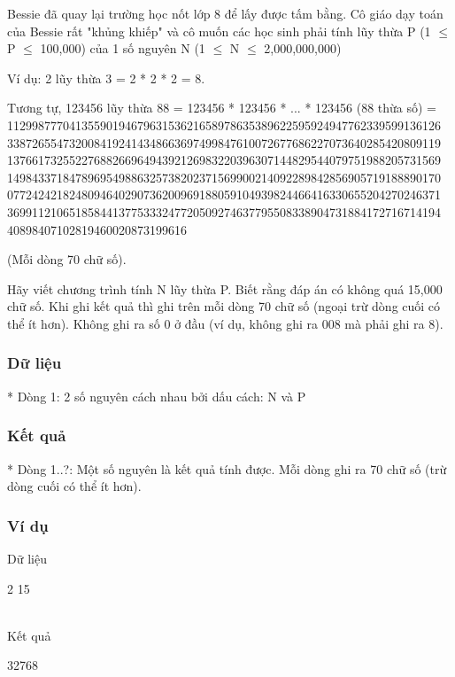 



   Bessie đã quay lại trường học nốt lớp 8 để lấy được tấm bằng. Cô giáo dạy toán của Bessie rất "khủng khiếp" và cô muốn các học sinh phải tính lũy thừa P (1  $\le$  P  $\le$  100,000) của 1 số nguyên N (1  $\le$  N  $\le$  2,000,000,000)  

   Ví dụ: 2 lũy thừa 3 = 2 * 2 * 2 = 8.  

   Tương tự, 123456 lũy thừa 88 = 123456 * 123456 * ... * 123456 (88  thừa số) =  1129987770413559019467963153621658978635389622595924947762339599136126 3387265547320084192414348663697499847610072677686227073640285420809119 1376617325522768826696494392126983220396307144829544079751988205731569 1498433718478969549886325738202371569900214092289842856905719188890170 0772424218248094640290736200969188059104939824466416330655204270246371 3699112106518584413775333247720509274637795508338904731884172716714194 40898407102819460020873199616  

   (Mỗi dòng 70 chữ số).  

   Hãy viết chương trình tính N lũy thừa P. Biết rằng đáp án có không quá 15,000 chữ số. Khi ghi kết quả thì ghi trên mỗi dòng 70 chữ số (ngoại trừ dòng cuối có thể ít hơn). Không ghi ra số 0 ở đầu (ví dụ, không ghi ra  008 mà phải ghi ra 8).  

\subsubsection{   Dữ liệu  }

   * Dòng 1: 2 số nguyên cách nhau bởi dấu cách: N và P  

\subsubsection{   Kết quả  }

   * Dòng 1..?: Một số nguyên là kết quả tính được.  Mỗi dòng ghi ra 70 chữ số (trừ dòng cuối có thể ít hơn).  

\subsubsection{   Ví dụ  }

   Dữ liệu  

   2 15  


\\



   Kết quả  

   32768  
